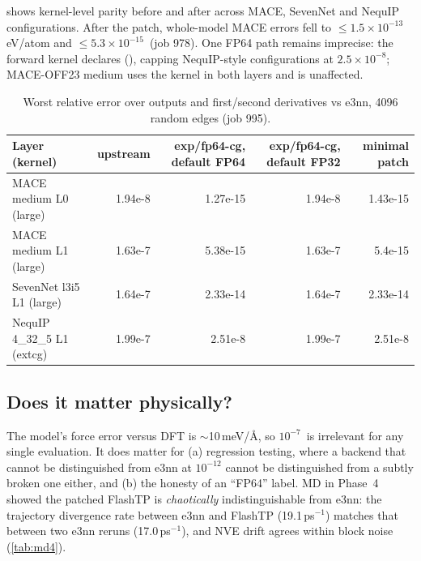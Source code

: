  shows kernel-level parity before and after across MACE, SevenNet and NequIP configurations. After the patch, whole-model MACE errors fell to $\le1.5\times10^{-13}$\,eV/atom and $\le5.3\times10^{-15}$\,\eVA{} (job 978). One FP64 path remains imprecise: the  forward kernel declares  (), capping NequIP-style configurations at $2.5\times10^{-8}$; MACE-OFF23 medium uses the  kernel in both layers and is unaffected.

\begin{table}[h]
\centering
\caption{Worst relative error over outputs and first/second derivatives vs e3nn, 4096 random edges (job 995).}
\label{tab:cgpatch}
\small
\begin{tabular}{lrrrr}
\toprule
Layer (kernel) & upstream & exp/fp64-cg, default FP64 & exp/fp64-cg, default FP32 & minimal patch \\
\midrule
MACE medium L0 (large) & 1.94e-8 & 1.27e-15 & 1.94e-8 & 1.43e-15 \\
MACE medium L1 (large) & 1.63e-7 & 5.38e-15 & 1.63e-7 & 5.4e-15 \\
SevenNet l3i5 L1 (large) & 1.64e-7 & 2.33e-14 & 1.64e-7 & 2.33e-14 \\
NequIP 4\_32\_5 L1 (extcg) & 1.99e-7 & 2.51e-8 & 1.99e-7 & 2.51e-8 \\
\bottomrule
\end{tabular}
\end{table}

\subsection{Does it matter physically?}
The model's force error versus DFT is $\sim$10\,meV/\AA, so $10^{-7}$\,\eVA{} is irrelevant for any single evaluation. It does matter for (a) regression testing, where a backend that cannot be distinguished from e3nn at $10^{-12}$ cannot be distinguished from a subtly broken one either, and (b) the honesty of an ``FP64'' label. MD in Phase~4 showed the patched FlashTP is \emph{chaotically} indistinguishable from e3nn: the trajectory divergence rate between e3nn and FlashTP (19.1\,ps$^{-1}$) matches that between two e3nn reruns (17.0\,ps$^{-1}$), and NVE drift agrees within block noise (\cref{tab:md4}).

